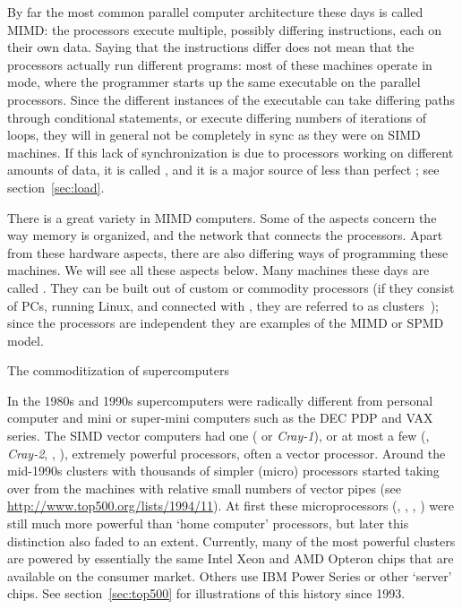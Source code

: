 By far the most common parallel computer architecture these days is
called \acf{MIMD}: the processors execute multiple, possibly differing
instructions, each on their own data. Saying that the instructions
differ does not mean that the processors actually run different
programs: most of these machines operate in  mode, where the
programmer starts up the same executable on the parallel processors.
Since the different instances of the executable can take differing
paths through conditional statements, or execute differing numbers of
iterations of loops, they will in general not be completely in sync as
they were on \ac{SIMD} machines. If this lack of synchronization is
due to processors working on different amounts of data, it is
called , and it is a major source of less
than perfect ; see section~\ref{sec:load}.

There is a great variety in \ac{MIMD} computers. Some of the aspects
concern the way memory is organized, and the network that connects the
processors. Apart from these hardware aspects, there are also
differing ways of programming these machines. We will see all these
aspects below. Many machines these days are 
called . They can be built out of custom or
commodity processors (if they consist of PCs, running Linux, and
connected with , they are referred to as 
{clusters}~\cite{Gropp:BeowulfBook}); since the processors are
independent they are examples of the \ac{MIMD} or \ac{SPMD} model.


 {The commoditization of supercomputers}
\label{sec:commodity}

In the 1980s and 1990s supercomputers were radically different from
personal computer and mini or super-mini computers such as the DEC PDP
and VAX series. The SIMD vector computers had one
( or \emph{Cray-1}), or
at most a few (, \emph{Cray-2},
, ), extremely
powerful processors, often a vector processor. Around the mid-1990s
clusters with thousands of simpler (micro) processors started taking
over from the machines with relative small numbers of vector pipes
(see \url{http://www.top500.org/lists/1994/11}). At first these
microprocessors (,
, ,
) were still much more powerful than `home
computer' processors, but later this distinction also faded to an
extent. Currently, many of the most powerful clusters are powered by
essentially the same Intel Xeon and AMD Opteron chips that are
available on the consumer market. Others use IBM Power Series or other
`server' chips. See section~\ref{sec:top500} for illustrations of
this history since 1993.

